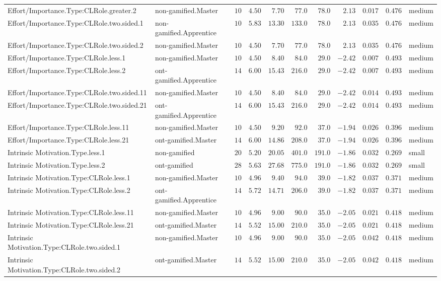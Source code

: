 \documentclass[6pt,a4paper]{article}
\begin{document}
\begin{landscape}
{\begin{longtable}{llrrrrrrrrl}
Effort/Importance.Type:CLRole.greater.2&non-gamified.Master&$10$&$4.50$&$ 7.70$&$ 77.0$&$ 78.0$&$ 2.13$&$0.017$&$0.476$&medium\tabularnewline
Effort/Importance.Type:CLRole.two.sided.1&non-gamified.Apprentice&$10$&$5.83$&$13.30$&$133.0$&$ 78.0$&$ 2.13$&$0.035$&$0.476$&medium\tabularnewline
Effort/Importance.Type:CLRole.two.sided.2&non-gamified.Master&$10$&$4.50$&$ 7.70$&$ 77.0$&$ 78.0$&$ 2.13$&$0.035$&$0.476$&medium\tabularnewline
Effort/Importance.Type:CLRole.less.1&non-gamified.Master&$10$&$4.50$&$ 8.40$&$ 84.0$&$ 29.0$&$-2.42$&$0.007$&$0.493$&medium\tabularnewline
Effort/Importance.Type:CLRole.less.2&ont-gamified.Apprentice&$14$&$6.00$&$15.43$&$216.0$&$ 29.0$&$-2.42$&$0.007$&$0.493$&medium\tabularnewline
Effort/Importance.Type:CLRole.two.sided.11&non-gamified.Master&$10$&$4.50$&$ 8.40$&$ 84.0$&$ 29.0$&$-2.42$&$0.014$&$0.493$&medium\tabularnewline
Effort/Importance.Type:CLRole.two.sided.21&ont-gamified.Apprentice&$14$&$6.00$&$15.43$&$216.0$&$ 29.0$&$-2.42$&$0.014$&$0.493$&medium\tabularnewline
Effort/Importance.Type:CLRole.less.11&non-gamified.Master&$10$&$4.50$&$ 9.20$&$ 92.0$&$ 37.0$&$-1.94$&$0.026$&$0.396$&medium\tabularnewline
Effort/Importance.Type:CLRole.less.21&ont-gamified.Master&$14$&$6.00$&$14.86$&$208.0$&$ 37.0$&$-1.94$&$0.026$&$0.396$&medium\tabularnewline
Intrinsic Motivation.Type.less.1&non-gamified&$20$&$5.20$&$20.05$&$401.0$&$191.0$&$-1.86$&$0.032$&$0.269$&small\tabularnewline
Intrinsic Motivation.Type.less.2&ont-gamified&$28$&$5.63$&$27.68$&$775.0$&$191.0$&$-1.86$&$0.032$&$0.269$&small\tabularnewline
Intrinsic Motivation.Type:CLRole.less.1&non-gamified.Master&$10$&$4.96$&$ 9.40$&$ 94.0$&$ 39.0$&$-1.82$&$0.037$&$0.371$&medium\tabularnewline
Intrinsic Motivation.Type:CLRole.less.2&ont-gamified.Apprentice&$14$&$5.72$&$14.71$&$206.0$&$ 39.0$&$-1.82$&$0.037$&$0.371$&medium\tabularnewline
Intrinsic Motivation.Type:CLRole.less.11&non-gamified.Master&$10$&$4.96$&$ 9.00$&$ 90.0$&$ 35.0$&$-2.05$&$0.021$&$0.418$&medium\tabularnewline
Intrinsic Motivation.Type:CLRole.less.21&ont-gamified.Master&$14$&$5.52$&$15.00$&$210.0$&$ 35.0$&$-2.05$&$0.021$&$0.418$&medium\tabularnewline
Intrinsic Motivation.Type:CLRole.two.sided.1&non-gamified.Master&$10$&$4.96$&$ 9.00$&$ 90.0$&$ 35.0$&$-2.05$&$0.042$&$0.418$&medium\tabularnewline
Intrinsic Motivation.Type:CLRole.two.sided.2&ont-gamified.Master&$14$&$5.52$&$15.00$&$210.0$&$ 35.0$&$-2.05$&$0.042$&$0.418$&medium\tabularnewline
\hline
\end{longtable}}

\end{landscape}
\end{document}
